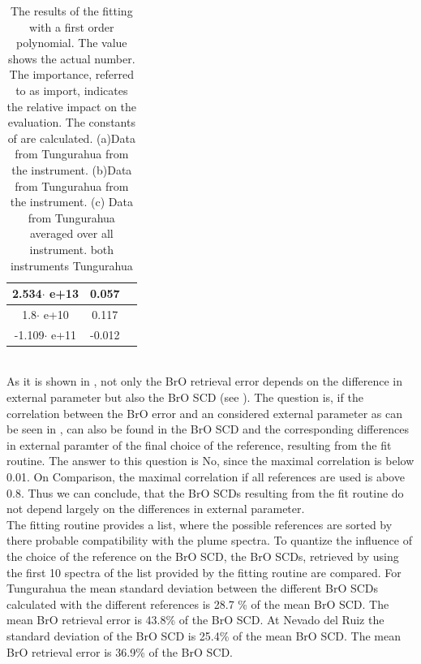 \documentclass  [
  paper    = a4,
  BCOR     = 10mm,
  twoside,
  fontsize = 12pt,
  fleqn,
  toc      = bibnumbered,
  toc      = listofnumbered,
  numbers  = noendperiod,
  headings = normal,
  listof   = leveldown,
  version  = 3.03
]                                       {scrreprt}
\begin{document}
\begin{table}[h!]
{\begin{tabular}{c|c|c}
			2.534$\cdot$ e+13&0.057\\
			\midrule
			1.8$\cdot$ e+10& 0.117\\
			\midrule
			-1.109$\cdot$ e+11&-0.012\\
			\midrule
			\bottomrule
	\end{tabular}}
		\label{tab:coefTung}
		\caption{The results of the fitting with a first order polynomial. The value shows the actual number. The importance,  referred to as
			import,  indicates the relative impact on the evaluation.
			The constants of  are calculated.
			(a)Data from Tungurahua  from the instrument. 
			(b)Data from Tungurahua from the  instrument. %
			(c) Data from Tungurahua averaged over all instrument.  %
			 both instruments Tungurahua%
		 }
	\end{table}			
	\\
	As it is shown in , not only the BrO retrieval error depends on the difference in external parameter but also the BrO SCD (see ). 
	The question is, if the correlation between the BrO error and an considered external parameter as can be seen in , can also be found in the BrO SCD and the corresponding differences in external paramter of the final choice of the reference, resulting from the fit routine. The answer to this question is No, since the maximal correlation is below 0.01. On Comparison, the maximal correlation if all references are used is above 0.8. Thus we can conclude, that the BrO SCDs resulting from the fit routine do not depend largely on the differences in external parameter.\\
	
	The fitting routine provides a list, where the possible references are sorted by there probable compatibility with the plume spectra. To quantize the influence of the choice of the reference on the BrO SCD, the BrO SCDs, retrieved by using the first 10 spectra of the list provided by the fitting routine are compared.
	For Tungurahua the mean standard deviation between the different BrO SCDs calculated with the different references is 28.7 \% of the mean BrO SCD. The mean BrO retrieval error is 43.8\% of the BrO SCD.
	At Nevado del Ruiz the standard deviation of the BrO SCD is 25.4\% of the mean BrO SCD. The mean BrO retrieval error is 36.9\% of the BrO SCD.
	
\end{document}
